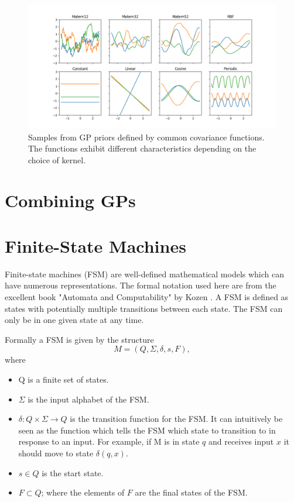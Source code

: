 \begin{figure} [t!]
    \centering
    \includegraphics[width=\textwidth]{figures/gp_kernels}
    \caption{Samples from GP priors defined by common covariance functions. 
    The functions exhibit different characteristics depending on the choice of kernel.}
    \label{fig:gp-kernels}
\end{figure}

\section{Combining GPs}

\section{Finite-State Machines}
Finite-state machines (FSM) are well-defined mathematical models which can have numerous representations.
The formal notation used here are from the excellent book "Automata and Computability" by Kozen \cite{Kozen1997}.
A FSM is defined as states with potentially multiple transitions between each state.
The FSM can only be in one given state at any time.

Formally a FSM is given by the structure
\[M = (Q, \Sigma, \delta, s, F),\]
where
\begin{itemize}
    \item Q is a finite set of states.
    \item $\Sigma$ is the input alphabet of the FSM.
    \item $\delta : Q \times \Sigma \rightarrow Q$ is the transition function for the FSM.
    It can intuitively be seen as the function which tells the FSM which state to transition to in response to an input.
    For example, if M is in state $q$ and receives input $x$ it should move to state $\delta(q, x)$.
    \item $s \in Q$ is the start state.
    \item $F \subset Q$; where the elements of $F$ are the final states of the FSM.
\end{itemize}

